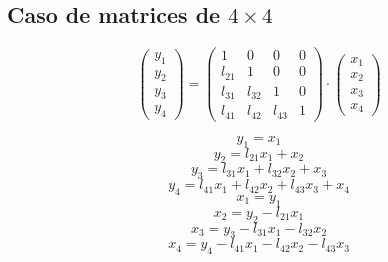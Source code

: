 \documentclass[10pt,a4paper,dvipdfmx]{article}
\begin{document}
\subsection{Caso de matrices de $4\times 4$ }
$$ \left( 
\begin{array}{c}
y_{1} \\
y_{2} \\
y_{3} \\
y_{4} 
 \end{array}
\right)
 = \left( 
\begin{array}{cccc}
1 & 0 & 0 & 0 \\
l_{{2}{1}} & 1 & 0 & 0 \\
l_{{3}{1}} & l_{{3}{2}} & 1 & 0 \\
l_{{4}{1}} & l_{{4}{2}} & l_{{4}{3}} & 1 
 \end{array}
\right)
 \cdot \left( 
\begin{array}{c}
x_{1} \\
x_{2} \\
x_{3} \\
x_{4} 
 \end{array}
\right)
 $$
\begin{multicols}{2}
$$ y_{1} = x_{1} $$
$$ y_{2} = l_{{2}{1}} x_{1} + x_{2} $$
$$ y_{3} = l_{{3}{1}} x_{1} + l_{{3}{2}} x_{2} + x_{3} $$
$$ y_{4} = l_{{4}{1}} x_{1} + l_{{4}{2}} x_{2} + l_{{4}{3}} x_{3} + x_{4} $$
\vfill\null
\columnbreak
$$ x_{1} = y_{1} $$
$$ x_{2} = y_{2}- l_{{2}{1}} x_{1} $$
$$ x_{3} = y_{3}- l_{{3}{1}} x_{1}- l_{{3}{2}} x_{2} $$
$$ x_{4} = y_{4}- l_{{4}{1}} x_{1}- l_{{4}{2}} x_{2}- l_{{4}{3}} x_{3} $$
\end{multicols}
\end{document}
